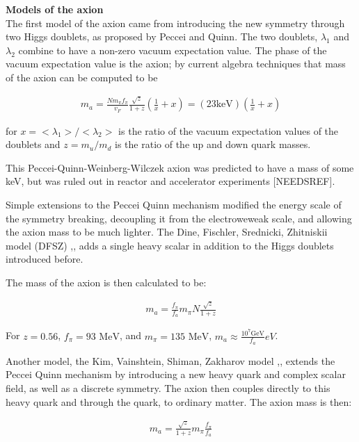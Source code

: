 \documentclass[12pt,twosides]{book}
\begin{document}
\begin{description}
\item \textbf{Models of the axion} \hfill \\

The first model of the axion came from introducing the new symmetry through two Higgs doublets, as proposed by Peccei and Quinn. The two doublets, $\lambda_1$ and $\lambda_2$ combine to have a non-zero vacuum expectation value. The phase of the vacuum expectation value is the axion; by current algebra techniques that mass of the axion can be computed to be 

\begin{align*}
m_a = \frac{Nm_\pi f_\pi}{v_F}\frac{\sqrt{z}}{1+z}(\frac{1}{x}+x) = (23 \text{keV})(\frac{1}{x}+x)
\end{align*}

for $ x = <\lambda_1>/<\lambda_2>$ is the ratio of the vacuum expectation values of the doublets and $z = m_u/m_d$ is the ratio of the up and down quark masses.

This Peccei-Quinn-Weinberg-Wilczek axion was predicted to have a mass of some keV, but was ruled out in reactor and accelerator experiments \cite{crystalball90} [NEEDSREF].

Simple extensions to the Peccei Quinn mechanism modified the energy scale of the symmetry breaking, decoupling it from the electroweweak scale, and allowing the axion mass to be much lighter. The Dine, Fischler, Srednicki, Zhitniskii model (DFSZ) \cite{dine81},\cite{zhitniskii81}, adds a single heavy scalar in addition to the Higgs doublets introduced before. 

The mass of the axion is then calculated to be:

\begin{align*}
m_a = \frac{f_\pi}{f_a} m_\pi N \frac{\sqrt{z}}{1+z}
\end{align*}

For $z= 0.56$, $f_\pi = 93 \text{ MeV}$, and $m_\pi = 135\text{ MeV}$, $m_a \approx \frac{10^7\text{GeV}}{f_a}eV$.

Another model, the Kim, Vainshtein, Shiman, Zakharov model \cite{kim79},\cite{shifman80}, extends the Peccei Quinn mechanism by introducing a new heavy quark and complex scalar field, as well as a discrete symmetry. The axion then couples directly to this heavy quark and through the quark, to ordinary matter. The axion mass is then:

\begin{align*}
m_a = \frac{\sqrt{z}}{1+z}m_\pi\frac{f_\pi}{f_a}
\end{align*}


\end{description}
\end{document}
